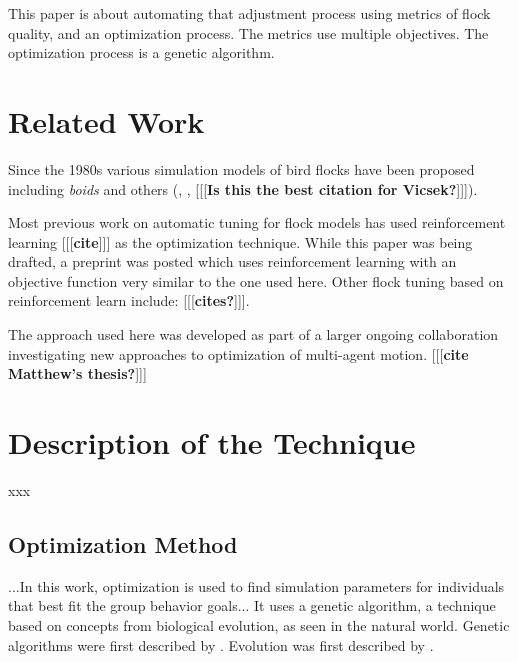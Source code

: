 \documentclass[letterpaper]{article}
\begin{document}
This paper is about automating that adjustment process using metrics of flock quality, and an optimization process. The metrics use multiple objectives. The optimization process is a genetic algorithm.

\section{Related Work}
\label{sec:related}

Since the 1980s various simulation models of bird flocks have been proposed including \textit{boids} \citep{reynolds_flocks_1987} and others (\citet{aoki_simulation_1982}, \citet{cucker_emergent_2007}, \citet{bhattacharya_collective_2010} [[[\textbf{Is this the best citation for Vicsek?}]]]).
\par

Most previous work on automatic tuning for flock models has used reinforcement learning [[[\textbf{cite}]]] as the optimization technique. While this paper was being drafted, a preprint was posted \citep{brambati_learning_2025} which uses reinforcement learning with an objective function very similar to the one used here. Other flock tuning based on reinforcement learn include:
[[[\textbf{cites?}]]].
\par


The approach used here was developed as part of a larger ongoing collaboration investigating new approaches to optimization of multi-agent motion. [[[\textbf{cite Matthew's thesis?}]]]

\section{Description of the Technique}
\label{sec:Description}

xxx
\par

\subsection{Optimization Method}
\label{subsec:Objective_Function}

...In this work, optimization is used to find simulation parameters for individuals that best fit the group behavior goals... It uses a genetic algorithm, a technique based on concepts from biological evolution, as seen in the natural world. Genetic algorithms were first described by \citet{holland_adaptation_1975}. Evolution was first described by \citet{darwin_origin_1859}.
\par
\end{document}
